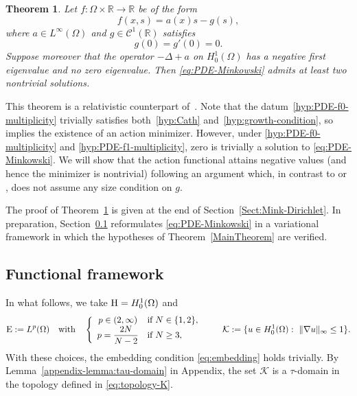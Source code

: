 \documentclass{article}
\newcommand{\boK}{\mathcal{K}}
\newcommand{\Hilb}{{\textnormal H}}
\newcommand{\Ebanach}{{\textnormal E}}
\newtheorem{theorem}{Theorem}[section]
\theoremstyle{definition}
\begin{document}
\begin{theorem}\label{MainTheorem-Dirichlet}
Let $f\colon\Omega\times\mathbb{R}\to\mathbb{R}$ be of the form
\begin{equation}\label{hyp:PDE-f0-multiplicity}
  f(x,s)=a(x)s - g(s),
\end{equation}
where $a\in L^\infty(\Omega)$ and $g\in\mathcal{C}^1(\mathbb{R})$ satisfies
\begin{equation}\label{hyp:PDE-f1-multiplicity}
  g(0)=g'(0)=0.
\end{equation}
Suppose moreover that the operator $-\Delta+a$ on $H_0^1(\Omega)$ has a
negative first eigenvalue and no zero eigenvalue.
Then \eqref{eq:PDE-Minkowski} admits at least two nontrivial solutions.
\end{theorem}

This theorem is a relativistic counterpart of~\cite[Theorem~6]{Bre-Nir}. Note
that the datum~\eqref{hyp:PDE-f0-multiplicity} trivially
satisfies both~\eqref{hyp:Cath} and~\eqref{hyp:growth-condition}, so \cite[Theorem~2.1]{BerJebMaw} implies the existence of an action minimizer. However, under \eqref{hyp:PDE-f0-multiplicity} and \eqref{hyp:PDE-f1-multiplicity}, zero is trivially a solution to \eqref{eq:PDE-Minkowski}. We will show that the action functional attains negative values (and hence the minimizer is nontrivial) following an argument which, in contrast to  \cite[Theorem~3.1]{BerJebMaw} or \cite[Theorem~6]{Bre-Nir}, does not assume any size condition on $g$.

The proof of Theorem~\ref{MainTheorem-Dirichlet} is given at the end of
Section~\ref{Sect:Mink-Dirichlet}.
In preparation, Section~\ref{Section:Mink-Functional} reformulates
\eqref{eq:PDE-Minkowski} in a variational framework in which the hypotheses of
Theorem~\ref{MainTheorem} are verified.
\subsection{Functional framework}\label{Section:Mink-Functional}
In what follows, we take $\Hilb=H_0^1(\Omega)$ and
\begin{equation}\label{eq:sets-PDE}
\Ebanach:=L^p(\Omega)\quad\hbox{with}\quad \left\{\begin{array}{cl}
         
          p\in(2,\infty)&\hbox{if }                 N\in\{1,2\}, \\
         p=\dfrac{2N}{N-2}&\hbox{if }N\geq3, 
    \end{array}\right.\qquad\boK:=\{u\in H_0^1(\Omega):\ \|\nabla u\|_\infty\leq1\}.
\end{equation}
With these choices, the embedding condition \eqref{eq:embedding} holds trivially. By Lemma~\ref{appendix-lemma:tau-domain} in Appendix, the set $\boK$ is a $\tau$-domain in the topology defined in \eqref{eq:topology-K}. 
\end{document}
